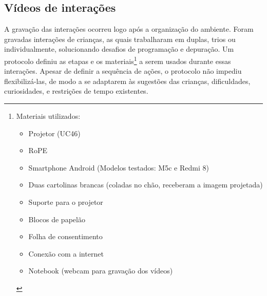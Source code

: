\subsection{Vídeos de interações}
A gravação das interações ocorreu logo após a organização do ambiente. Foram gravadas interações de crianças, as quais trabalharam em duplas, trios ou individualmente, solucionando desafios de programação e depuração. Um protocolo definiu as etapas e os materiais\footnote{
    Materiais utilizados:
    \begin{itemize}
        \item Projetor (UC46)
        \item RoPE
        \item Smartphone Android (Modelos testados: M5c e Redmi 8)
        \item Duas cartolinas brancas (coladas no chão, receberam a imagem projetada)
        \item Suporte para o projetor
        \item Blocos de papelão
        \item Folha de consentimento
        \item Conexão com a internet
        \item Notebook (webcam para gravação dos vídeos)
    \end{itemize}
} a serem usados durante essas interações. Apesar de definir a sequência de ações, o protocolo não impediu flexibilizá-las, de modo a se adaptarem às sugestões das crianças, dificuldades, curiosidades, e restrições de tempo existentes.

